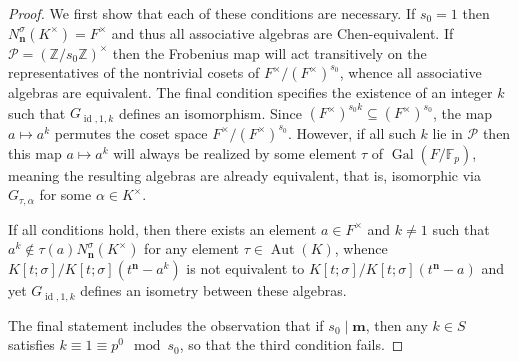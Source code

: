 \documentclass[11pt]{amsart}
\theoremstyle{plain}
\theoremstyle{definition}
\numberwithin{equation}{section}
\numberwithin{figure}{section}
\newcommand{\ZZ}{\mathbb{Z}}
\newcommand{\Kone}[1]{K[t;\sigma]/K[t;\sigma](t^{\de}-#1)}
\DeclareMathOperator{\id}{id}
\newcommand{\os}{{\mathbf{m}}}  %
\newcommand{\de}{{\mathbf{n}}}  %
\DeclareMathOperator{\Gal}{Gal}
\DeclareMathOperator{\Aut}{Aut}
\begin{document}
\begin{proof}
We first show that each of these conditions are necessary.
    If $s_0=1$ then $N_\de^\sigma(K^\times)=F^\times$ and thus all associative algebras are Chen-equivalent.  If $\mathscr{P}=(\ZZ/s_0\ZZ)^\times$ then the Frobenius map will act transitively on the representatives of the nontrivial cosets of $F^\times/(F^\times)^{s_0}$, whence all associative algebras are equivalent.
The final condition specifies the existence of an integer $k$ such that $G_{\id,1,k}$ defines an isomorphism.  Since $(F^\times)^{s_0k}\subseteq (F^\times)^{s_0}$, the map $a\mapsto a^k$ permutes the coset space $F^\times/(F^\times)^{s_0}$.  However, if all such $k$ lie in $\mathscr{P}$ then this map $a\mapsto a^k$ will always be realized by some element $\tau$ of $\Gal(F/\mathbb{F}_p)$, meaning the resulting algebras are already equivalent, that is, isomorphic via  $G_{\tau,\alpha}$ for some $\alpha\in K^\times$.

If all conditions hold, then there exists an element $a\in F^\times$ and $k\neq 1$ such that $a^k\notin \tau(a)N_\de^\sigma(K^\times)$ for any element $\tau\in\Aut(K)$, whence $\Kone{a^k}$ is not equivalent to $\Kone{a}$ and yet $G_{\id,1,k}$ defines an isometry between these algebras.

The final statement includes the observation that if $s_0\mid \os$, then any $k\in S$ satisfies $k\equiv 1 \equiv p^0\mod s_0$, so that the third condition fails.
\end{proof}
\end{document}
